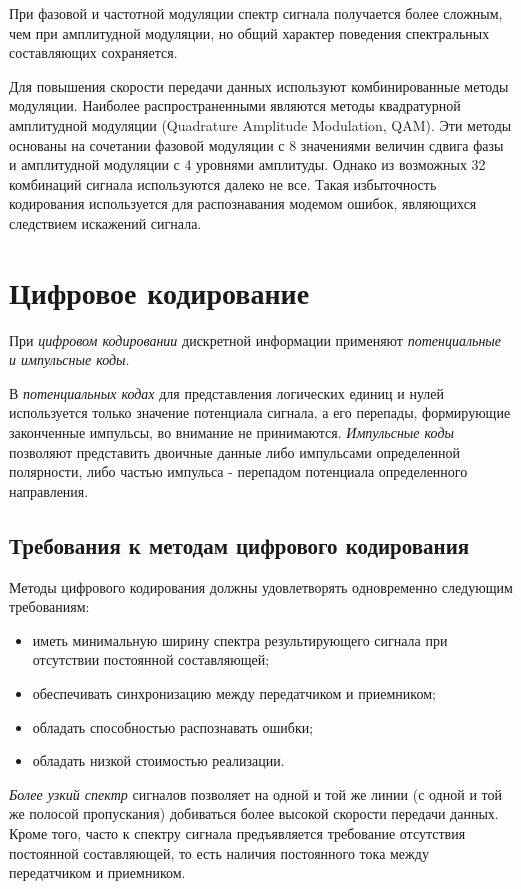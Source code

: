 При фазовой и частотной модуляции спектр сигнала получается более сложным, чем при амплитудной модуляции, но общий характер поведения спектральных составляющих сохраняется.

Для повышения скорости передачи данных используют комбинированные методы модуляции.
Наиболее распространенными являются методы квадратурной амплитудной модуляции (Quadrature Amplitude Modulation, QAM).
Эти методы основаны на сочетании фазовой модуляции с 8 значениями величин сдвига фазы и амплитудной модуляции с 4 уровнями амплитуды.
Однако из возможных 32 комбинаций сигнала используются далеко не все.
Такая избыточность кодирования используется для распознавания модемом ошибок, являющихся следствием искажений сигнала.

\section{Цифровое кодирование}

При \emph{цифровом кодировании} дискретной информации применяют \emph{потенциальные и импульсные коды}.

В \emph{потенциальных кодах} для представления логических единиц и нулей используется только значение потенциала сигнала, а его перепады, формирующие законченные импульсы, во внимание не принимаются.
\emph{Импульсные коды} позволяют представить двоичные данные либо импульсами определенной полярности, либо частью импульса - перепадом потенциала определенного направления.

\subsection{Требования к методам цифрового кодирования}

Методы цифрового кодирования должны удовлетворять одновременно следующим требованиям:
\begin{itemize}
    \item иметь минимальную ширину спектра результирующего сигнала при отсутствии постоянной составляющей;
    \item обеспечивать синхронизацию между передатчиком и приемником;
    \item обладать способностью распознавать ошибки;
    \item обладать низкой стоимостью реализации.
\end{itemize}

\emph{Более узкий спектр} сигналов позволяет на одной и той же линии (с одной и той же полосой пропускания) добиваться более высокой скорости передачи данных.
Кроме того, часто к спектру сигнала предъявляется требование отсутствия постоянной составляющей, то есть наличия постоянного тока между передатчиком и приемником.

